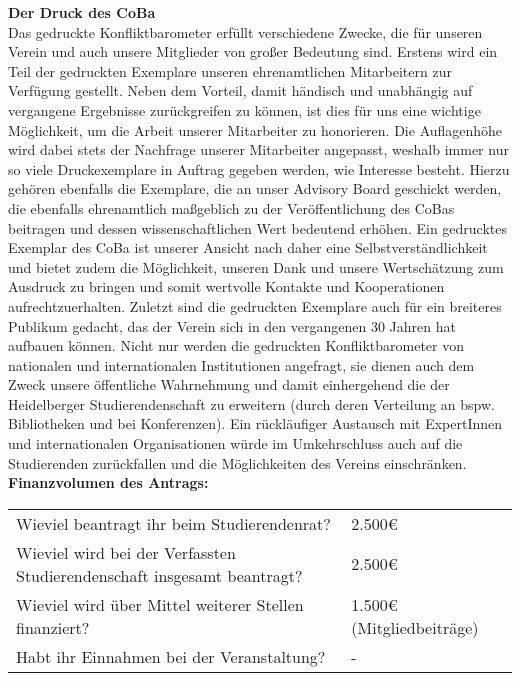 {    \textbf{Der Druck des CoBa}\\
    Das gedruckte Konfliktbarometer erfüllt verschiedene Zwecke, die für unseren Verein und auch unsere Mitglieder von großer Bedeutung sind. Erstens wird ein Teil der gedruckten Exemplare unseren ehrenamtlichen Mitarbeitern zur Verfügung gestellt. Neben dem Vorteil, damit händisch und unabhängig auf vergangene Ergebnisse zurückgreifen zu können, ist dies für uns eine wichtige Möglichkeit, um die Arbeit unserer Mitarbeiter zu honorieren. Die Auflagenhöhe wird dabei stets der Nachfrage unserer Mitarbeiter angepasst, weshalb immer nur so viele Druckexemplare in Auftrag gegeben werden, wie Interesse besteht. Hierzu gehören ebenfalls die Exemplare, die an unser Advisory Board geschickt werden, die ebenfalls ehrenamtlich maßgeblich zu der Veröffentlichung des CoBas beitragen und dessen wissenschaftlichen Wert bedeutend erhöhen. Ein gedrucktes Exemplar des CoBa ist unserer Ansicht nach daher eine Selbstverständlichkeit und bietet zudem die Möglichkeit, unseren Dank und unsere Wertschätzung zum Ausdruck zu bringen und somit wertvolle Kontakte und Kooperationen aufrechtzuerhalten. Zuletzt sind die gedruckten Exemplare auch für ein breiteres Publikum gedacht, das der Verein sich in den vergangenen 30 Jahren hat aufbauen können. Nicht nur werden die gedruckten Konfliktbarometer von nationalen und internationalen Institutionen angefragt, sie dienen auch dem Zweck unsere öffentliche Wahrnehmung und damit einhergehend die der Heidelberger Studierendenschaft zu erweitern (durch deren Verteilung an bspw. Bibliotheken und bei Konferenzen). Ein rückläufiger Austausch mit ExpertInnen und internationalen Organisationen würde im Umkehrschluss auch auf die Studierenden zurückfallen und die Möglichkeiten des Vereins einschränken.\\[1em]
    \textbf{Finanzvolumen des Antrags:}\\
    \newline
    \begin{tabular}{l l}
        Wieviel beantragt ihr beim Studierendenrat?                             & 2.500€       \\
        Wieviel wird bei der Verfassten Studierendenschaft insgesamt beantragt? & 2.500€    \\
        Wieviel wird über Mittel weiterer Stellen finanziert?                   & 1.500€ (Mitgliedbeiträge)      \\
        Habt ihr Einnahmen bei der Veranstaltung?                               & -\\

\end{tabular}}
